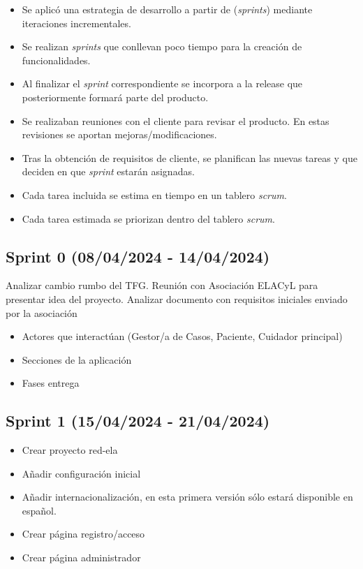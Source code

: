 \begin{itemize}
\tightlist
\item Se aplicó una estrategia de desarrollo a partir de (\emph{sprints}) mediante iteraciones incrementales.
\item Se realizan \emph{sprints} que conllevan poco tiempo para la creación de funcionalidades.
\item Al finalizar el \emph{sprint} correspondiente se incorpora a la release que posteriormente formará parte del producto.
\item Se realizaban reuniones con el cliente para revisar el producto. En estas revisiones se aportan mejoras/modificaciones.
\item Tras la obtención de requisitos de cliente, se planifican las nuevas tareas y que deciden en que \emph{sprint} estarán asignadas.
\item Cada tarea incluida se estima en tiempo en un tablero \emph{scrum}.
\item Cada tarea estimada se priorizan dentro del tablero \emph{scrum}.
\end{itemize}

\subsection{Sprint 0 (08/04/2024 - 14/04/2024)}
Analizar cambio rumbo del TFG.
Reunión con Asociación ELACyL para presentar idea del proyecto.
Analizar documento con requisitos iniciales enviado por la asociación
\begin{itemize}
\tightlist
\item Actores que interactúan (Gestor/a de Casos, Paciente, Cuidador principal)
\item Secciones de la aplicación
\item Fases entrega
\end{itemize}

\subsection{Sprint 1 (15/04/2024 - 21/04/2024)}
\begin{itemize}
\tightlist
\item Crear proyecto red-ela
\item Añadir configuración inicial
\item Añadir internacionalización, en esta primera versión sólo estará disponible en español.
\item Crear página registro/acceso
\item Crear página administrador
\end{itemize}

